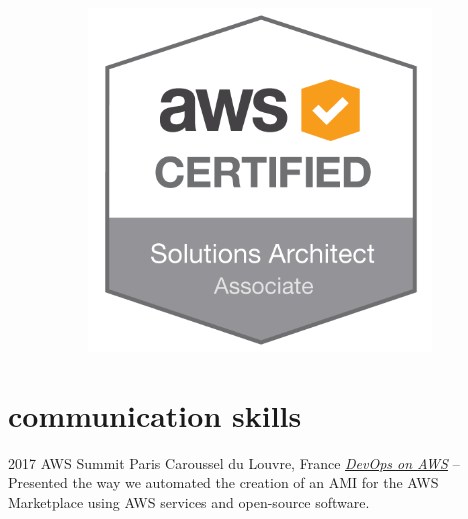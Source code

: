 \documentclass[]{cv-a4}
\begin{document}
\begin{figure}[h!]
\begin{subfigure}[b]{0.2\linewidth}
  \end{subfigure}
  \begin{subfigure}[b]{0.2\linewidth}
    \includegraphics[width=\linewidth]{images/SAA.png}
  \end{subfigure}
\end{figure}



\section{communication skills}

\begin{entrylist}


\entry
{2017}
{AWS Summit Paris}
{Caroussel du Louvre, France}
{\emph{\href{https://youtu.be/54cwFTMPxOo}{DevOps on AWS} } -- Presented the way we automated the creation of an AMI for the AWS Marketplace using AWS services and open-source software.}


\end{entrylist}
\end{document}
